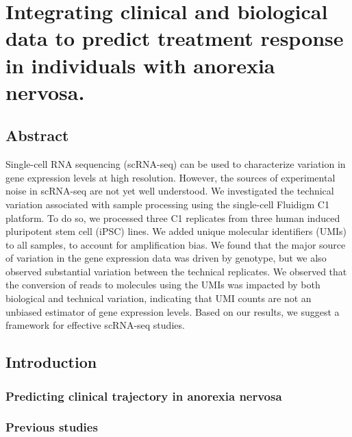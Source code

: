 \chapter{Integrating clinical and biological data to predict treatment response in individuals with anorexia nervosa.}\label{ch:singleCellSeq}

\section[Abstract]{Abstract\footnotemark}

Single-cell RNA sequencing (scRNA-seq) can be used to characterize
variation in gene expression levels at high resolution. However, the
sources of experimental noise in scRNA-seq are not yet well
understood.  We investigated the technical variation associated with
sample processing using the single-cell Fluidigm C1 platform. To do
so, we processed three C1 replicates from three human induced
pluripotent stem cell (iPSC) lines. We added unique molecular
identifiers (UMIs) to all samples, to account for amplification
bias. We found that the major source of variation in the gene
expression data was driven by genotype, but we also observed
substantial variation between the technical replicates. We observed
that the conversion of reads to molecules using the UMIs was impacted
by both biological and technical variation, indicating that UMI counts
are not an unbiased estimator of gene expression levels. Based on our
results, we suggest a framework for effective scRNA-seq studies.


\section{Introduction}\label{ch04-introduction}

\subsection{Predicting clinical trajectory in anorexia nervosa}

\subsection{Previous studies}

